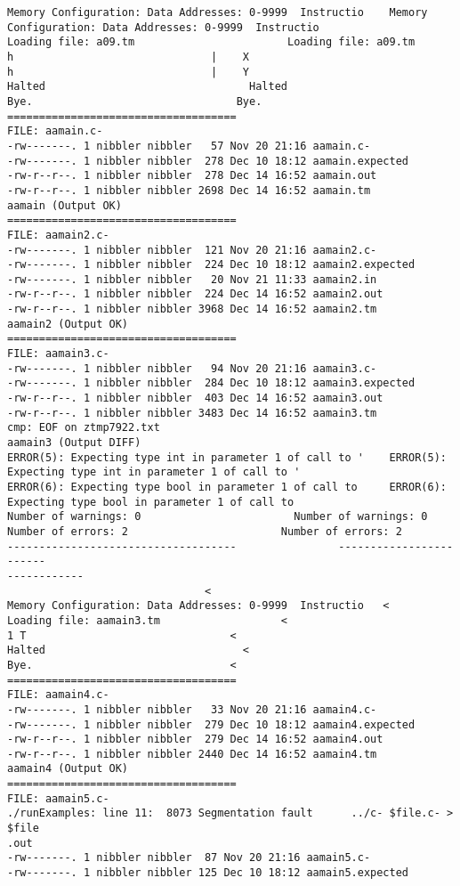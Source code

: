 \documentclass[12pt]{book}
\begin{document}
\begin{lstlisting}
Memory Configuration: Data Addresses: 0-9999  Instructio    Memory 
Configuration: Data Addresses: 0-9999  Instructio
Loading file: a09.tm                        Loading file: a09.tm
h                               |    X
h                               |    Y
Halted                                Halted
Bye.                                Bye.
====================================
FILE: aamain.c-
-rw-------. 1 nibbler nibbler   57 Nov 20 21:16 aamain.c-
-rw-------. 1 nibbler nibbler  278 Dec 10 18:12 aamain.expected
-rw-r--r--. 1 nibbler nibbler  278 Dec 14 16:52 aamain.out
-rw-r--r--. 1 nibbler nibbler 2698 Dec 14 16:52 aamain.tm
aamain (Output OK)
====================================
FILE: aamain2.c-
-rw-------. 1 nibbler nibbler  121 Nov 20 21:16 aamain2.c-
-rw-------. 1 nibbler nibbler  224 Dec 10 18:12 aamain2.expected
-rw-------. 1 nibbler nibbler   20 Nov 21 11:33 aamain2.in
-rw-r--r--. 1 nibbler nibbler  224 Dec 14 16:52 aamain2.out
-rw-r--r--. 1 nibbler nibbler 3968 Dec 14 16:52 aamain2.tm
aamain2 (Output OK)
====================================
FILE: aamain3.c-
-rw-------. 1 nibbler nibbler   94 Nov 20 21:16 aamain3.c-
-rw-------. 1 nibbler nibbler  284 Dec 10 18:12 aamain3.expected
-rw-r--r--. 1 nibbler nibbler  403 Dec 14 16:52 aamain3.out
-rw-r--r--. 1 nibbler nibbler 3483 Dec 14 16:52 aamain3.tm
cmp: EOF on ztmp7922.txt
aamain3 (Output DIFF)
ERROR(5): Expecting type int in parameter 1 of call to '    ERROR(5): 
Expecting type int in parameter 1 of call to '
ERROR(6): Expecting type bool in parameter 1 of call to     ERROR(6): 
Expecting type bool in parameter 1 of call to 
Number of warnings: 0                        Number of warnings: 0
Number of errors: 2                        Number of errors: 2
------------------------------------                ------------------------
------------
                               <
Memory Configuration: Data Addresses: 0-9999  Instructio   <
Loading file: aamain3.tm                   <
1 T                                <
Halted                               <
Bye.                               <
====================================
FILE: aamain4.c-
-rw-------. 1 nibbler nibbler   33 Nov 20 21:16 aamain4.c-
-rw-------. 1 nibbler nibbler  279 Dec 10 18:12 aamain4.expected
-rw-r--r--. 1 nibbler nibbler  279 Dec 14 16:52 aamain4.out
-rw-r--r--. 1 nibbler nibbler 2440 Dec 14 16:52 aamain4.tm
aamain4 (Output OK)
====================================
FILE: aamain5.c-
./runExamples: line 11:  8073 Segmentation fault      ../c- $file.c- > $file
.out
-rw-------. 1 nibbler nibbler  87 Nov 20 21:16 aamain5.c-
-rw-------. 1 nibbler nibbler 125 Dec 10 18:12 aamain5.expected

\end{lstlisting}
\end{document}
